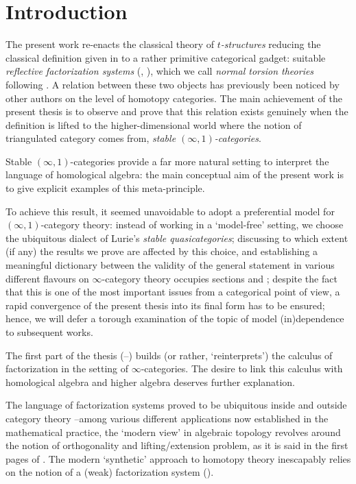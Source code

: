 \chapter{Introduction}
\thispagestyle{empty}
The present work re\hyp{}enacts the classical theory of \emph{$t$\hyp{}structures} reducing the classical definition given in \cite{BBDPervers,Kashiwara} to a rather primitive categorical gadget: suitable \emph{reflective factorization systems} (\adef {}, ), which we call \emph{normal torsion theories} following \cite{CHK,RT}. A  relation between these two objects has previously been noticed by other authors \cite{RT,HPS,Beligiannisreiten} on the level of homotopy categories. The main achievement of the present thesis is to observe and prove that this relation exists genuinely when the definition is lifted to the higher\hyp{}dimensional world where the notion of triangulated category comes from, \ie \emph{stable $(\infty,1)$\hyp{}categories}.

Stable $(\infty,1)$\hyp{}categories provide a far more natural setting to interpret the language of homological algebra: the main conceptual aim of the present work is to give explicit examples of this meta\hyp{}principle.

To achieve this result, it seemed unavoidable to adopt a preferential model for $(\infty,1)$\hyp{}category theory: instead of working in a `model\hyp{}free' setting, we choose the ubiquitous dialect of Lurie's \emph{stable quasicategories}; discussing to which extent (if any) the results we prove are affected by this choice, and establishing a meaningful dictionary between the validity of the general statement  in various different flavours on $\infty$\hyp{}category theory occupies sections  and ; despite the fact that this is one of the most important issues from a categorical point of view, a rapid convergence of the present thesis into its final form has to be ensured; hence, we will defer a torough examination of the topic of model (in)dependence to subsequent works.

The first part of the thesis (\achap {}--) builds (or rather, `reinterprets') the calculus of factorization in the setting of $\infty$\hyp{}categories. The desire to link this calculus with homological algebra and higher algebra deserves further explanation.

The language of factorization systems proved to be ubiquitous inside and outside category theory --among various different applications now established in the mathematical practice, the `modern view' in algebraic topology revolves around the notion of orthogonality and lifting\fshyp{}extension problem, as it is said in the first pages of \cite{Whitehead1978}. The modern `synthetic' approach to homotopy theory inescapably relies on the notion of a (weak) factorization system (\cite{Qui,Dwyer1995,riehl2011algebraic}).

